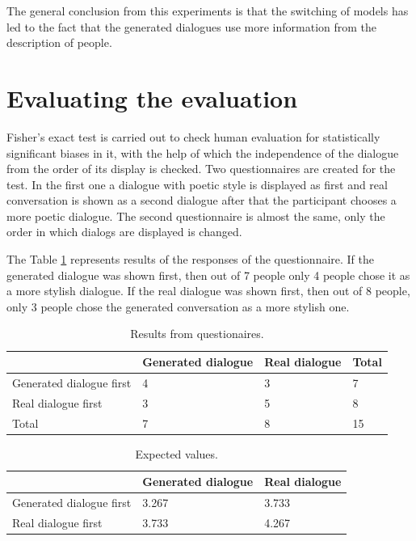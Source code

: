 The general conclusion from this experiments is that the switching of models has led to the fact that the generated dialogues use more information from the description of people.

\section{Evaluating the evaluation}
Fisher's exact test is carried out to check human evaluation for statistically significant biases in it, with the help of which the independence of the dialogue from the order of its display is checked. Two questionnaires are created for the test. In the first one a dialogue with poetic style is displayed as first and real conversation is shown as a second dialogue after that the participant chooses a more poetic dialogue. The second questionnaire is almost the same, only the order in which dialogs are displayed is changed.

The Table \ref{tab:fisher} represents results of the responses of the questionnaire. If the generated dialogue was shown first, then out of 7 people only 4 people chose it as a more stylish dialogue. If the real dialogue was shown first, then out of 8 people, only 3 people chose the generated conversation as a more stylish one.


\begin{table}[ht]
\centering
 \begin{tabular}{|p{4cm}|p{4cm}|p{3cm}|p{2cm}|} 
 \hline
  & Generated dialogue & Real dialogue & Total\\
 \hline
  Generated dialogue first & 4 & 3 & 7 \\
 \hline
  Real dialogue first & 3 & 5 & 8 \\
 \hline
  Total & 7 & 8 & 15\\
 \hline
 \end{tabular}
 \caption{Results from questionaires.}
\label{tab:fisher}
\end{table}

\begin{table}[ht]
\centering
 \begin{tabular}{|p{4cm}|p{4cm}|p{3cm}|} 
 \hline
  & Generated dialogue & Real dialogue \\
 \hline
  Generated dialogue first & 3.267 & 3.733 \\
 \hline
  Real dialogue first & 3.733 & 4.267 \\
 \hline
 \end{tabular}
 \caption{Expected values.}
\label{tab:expected_vals}
\end{table}

